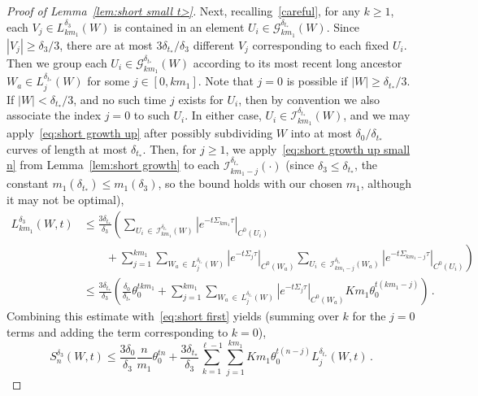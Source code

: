 \documentclass[AHL,Unicode,longabstracts,published]{cedram}
\newcommand{\cG}{\mathcal{G}}
\newcommand{\cI}{\mathcal{I}}
\begin{document}
\begin{proof}[Proof of Lemma~\ref{lem:short small t>}]
Next, recalling~\eqref{careful}, for any $k \ge 1$, each $V_j \in L^{\delta_3}_{k m_1}(W)$ is contained in an element $U_i \in \cG_{k m_1}^{\delta_{t_*}}(W)$. Since $|V_j| \ge \delta_3/3$, there are at most $3 \delta_{t_*}/\delta_3$ different $V_j$ corresponding to each fixed $U_i$. Then we group each $U_i \in \cG_{km_1}^{\delta_{t_*}}(W)$ according to its most recent long ancestor $W_a \in L_j^{\delta_{t_*}}(W)$ for some $j \in [0, k m_1]$. Note that $j=0$ is possible if $|W| \ge \delta_{t_*}/3$. If $|W| < \delta_{t_*}/3$, and no such time $j$ exists for $U_i$, then by convention we also associate the index $j=0$ to such $U_i$. In either case, $U_i \in \cI_{km_1}^{\delta_{t_*}}(W)$, and we may apply~\eqref{eq:short growth up} after possibly subdividing $W$ into at most $\delta_0/\delta_{t_*}$ curves of length at most $\delta_{t_*}$. Then, for $j \ge 1$, we apply~\eqref{eq:short growth up small n} from Lemma~\ref{lem:short growth} to each $\cI_{km_1 - j}^{\delta_{t_*}}(\cdot)$ (since $\delta_3 \le \delta_{t_*}$, the constant $m_1(\delta_{t_*}) \le m_1(\delta_3)$, so the bound holds with our chosen $m_1$, although it may not be optimal),
\begingroup
\allowdisplaybreaks
\begin{align*}
L^{\delta_3}_{km_1}(W, t) & \le \frac{3 \delta_{t_*}}{\delta_3}
\left(\sum_{U_i\,\in\,\cI_{km_1}^{\delta_{t_*}}(W) }\left|e^{-t\Sigma_{k m_1} \tau}\right|_{C^0(U_i)} \right.\\
& \qquad +\left.
\sum_{j=1}^{km_1} \sum_{W_a\,\in\,L_j^{\delta_{t_*}}(W)}\left|e^{-t\Sigma_{j} \tau}\right|_{C^0(W_a)} \sum_{U_i\,\in\,\cI_{km_1 -j}^{\delta_{t_*}}(W_a)}\left|e^{-t\Sigma_{k m_1-j} \tau}\right|_{C^0(U_i)} \right) \\
& \le \frac{3 \delta_{t_*}}{\delta_3} \left(\frac{\delta_0}{\delta_{t_*}} \theta_0^{t km_1 } + \sum_{j=1}^{km_1} \sum_{W_a\,\in\,L_j^{\delta_{t_*}}(W)}\left|e^{-t\Sigma_{j} \tau}\right|_{C^0(W_a) } { Km_1 } \theta_0^{t (km_1 - j)} \right) \,.
\end{align*}
\endgroup
Combining this estimate with~\eqref{eq:short first} yields (summing over $k$ for the $j=0$ terms and adding the term corresponding to $k=0$),
\begin{equation}\label{<}
S_n^{\delta_3}(W,t)
\le \frac{3 \delta_0}{\delta_3} \frac{n}{m_1} \theta_0^{t n} +
\frac{3 { \delta_{t_*} } }{\delta_3}
\sum_{k=1}^{\ell-1} \sum_{j=1}^{km_1} { Km_1 } \theta_0^{t (n -j)} L_j^{\delta_{t_*}}(W,t) \,.
\end{equation}


\end{proof}
\end{document}
